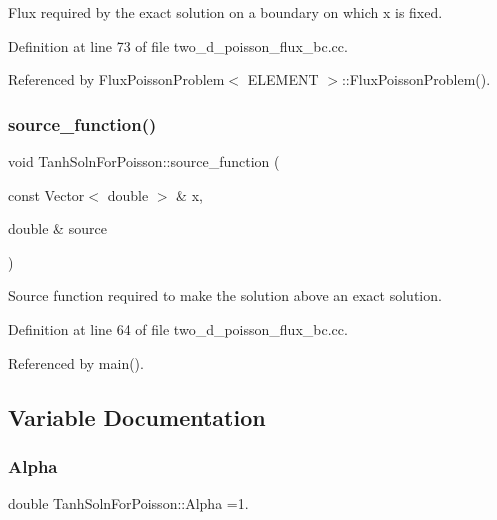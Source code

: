 Flux required by the exact solution on a boundary on which x is fixed. 



Definition at line 73 of file two\+\_\+d\+\_\+poisson\+\_\+flux\+\_\+bc.\+cc.



Referenced by Flux\+Poisson\+Problem$<$ E\+L\+E\+M\+E\+N\+T $>$\+::\+Flux\+Poisson\+Problem().

\mbox{\label{namespaceTanhSolnForPoisson_a967bc28320e02534beb714846b63e251}} 
\subsubsection{\texorpdfstring{source\+\_\+function()}{source\_function()}}
{\footnotesize\ttfamily void Tanh\+Soln\+For\+Poisson\+::source\+\_\+function (\begin{DoxyParamCaption}\item[{const Vector$<$ double $>$ \&}]{x,  }\item[{double \&}]{source }\end{DoxyParamCaption})}



Source function required to make the solution above an exact solution. 



Definition at line 64 of file two\+\_\+d\+\_\+poisson\+\_\+flux\+\_\+bc.\+cc.



Referenced by main().



\subsection{Variable Documentation}
\mbox{\label{namespaceTanhSolnForPoisson_ae676ccd186d5df119cce811596d949c1}} 
\subsubsection{\texorpdfstring{Alpha}{Alpha}}
{\footnotesize\ttfamily double Tanh\+Soln\+For\+Poisson\+::\+Alpha =1.}




